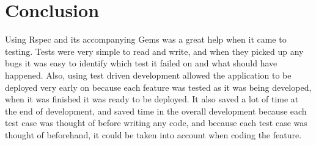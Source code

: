 \section{Conclusion}
Using Rspec and its accompanying Gems was a great help when it came to testing. Tests were very simple to read and write, and when they picked up any bugs it was easy to identify which test it failed on and what should have happened. Also, using test driven development allowed the application to be deployed very early on because each feature was tested as it was being developed, when it was finished it was ready to be deployed. It also saved a lot of time at the end of development, and saved time in the overall development because each test case was thought of before writing any code, and because each test case was thought of beforehand, it could be taken into account when coding the feature.